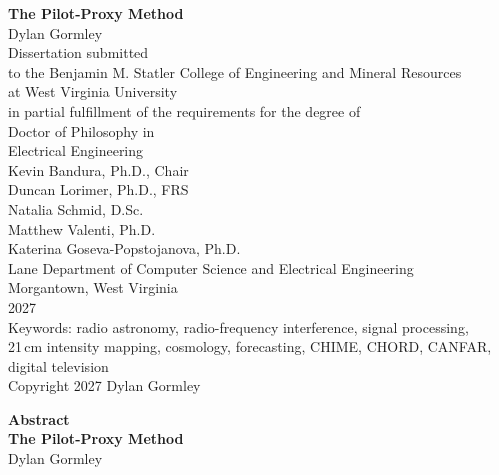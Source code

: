 \documentclass[11pt,oneside]{report}
\begin{document}
\hypersetup{pageanchor=false}
\setcounter{page}{1}

\begin{titlepage}
\thispagestyle{empty}
\centering

\vspace*{0.65in}
{\large\textbf{The Pilot-Proxy Method}}\\[0.70in]
{\large Dylan Gormley}\\[0.70in]

Dissertation submitted\\
to the Benjamin M. Statler College of Engineering and Mineral Resources\\
at West Virginia University\\[0.35in]
in partial fulfillment of the requirements for the degree of\\[0.16in]
Doctor of Philosophy in\\
Electrical Engineering\\[0.65in]

Kevin Bandura, Ph.D., Chair\\
Duncan Lorimer, Ph.D., FRS\\
Natalia Schmid, D.Sc.\\
Matthew Valenti, Ph.D.\\
Katerina Goseva-Popstojanova, Ph.D.\\[0.55in]

Lane Department of Computer Science and Electrical Engineering\\[0.55in]

Morgantown, West Virginia\\
2027\\[0.55in]

Keywords: radio astronomy, radio-frequency interference, signal processing,\\
21\,cm intensity mapping, cosmology, forecasting, CHIME, CHORD, CANFAR, digital television\\[0.24in]
Copyright 2027 Dylan Gormley
\end{titlepage}
\setcounter{page}{2}%
\hypersetup{pageanchor=true}

\clearpage
\thispagestyle{empty}
\begin{center}
    {\textbf{Abstract}}\\[0.20in]
    {\textbf{The Pilot-Proxy Method}}\\[0.18in]
    {Dylan Gormley}\\[0.32in]
\end{center}
\end{document}

